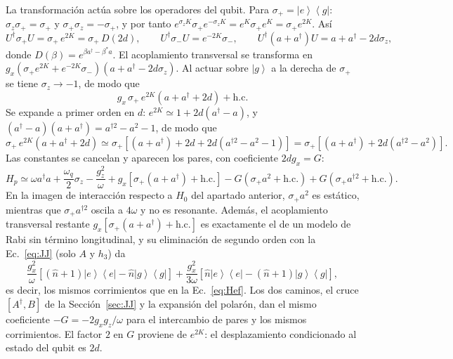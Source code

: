 \documentclass[11pt,a4paper]{article}
\newcommand{\ket}[1]{\left|#1\right\rangle}
\newcommand{\bra}[1]{\left\langle#1\right|}
\newcommand{\spl}{\sigma_{+}}
\newcommand{\smi}{\sigma_{-}}
\newcommand{\Pe}{\ket{e}\!\bra{e}}
\newcommand{\Pg}{\ket{g}\!\bra{g}}
\newcommand{\hn}{\hat n}
\theoremstyle{definition}
\begin{document}
La transformación actúa sobre los operadores del qubit. Para $\spl=\ket{e}\bra{g}$: $\sigma_z\spl=\spl$ y $\spl\sigma_z=-\spl$, y por tanto $e^{\sigma_zK}\spl e^{-\sigma_zK}=e^{K}\spl e^{K}=\spl e^{2K}$. Así
\begin{equation}
U^{\dagger}\spl U=\spl\,e^{2K}=\spl\,D(2d),\qquad U^{\dagger}\smi U=e^{-2K}\smi,\qquad U^{\dagger}(a+a^{\dagger})U=a+a^{\dagger}-2d\sigma_z,
\end{equation}
donde $D(\beta)=e^{\beta a^{\dagger}-\beta^{*}a}$. El acoplamiento transversal se transforma en $g_x(\spl e^{2K}+e^{-2K}\smi)(a+a^{\dagger}-2d\sigma_z)$. Al actuar sobre $\ket{g}$ a la derecha de $\spl$ se tiene $\sigma_z\to-1$, de modo que
\begin{equation}
g_x\,\spl\,e^{2K}\left(a+a^{\dagger}+2d\right)+\mathrm{h.c.}
\end{equation}
Se expande a primer orden en $d$: $e^{2K}\simeq1+2d(a^{\dagger}-a)$, y $(a^{\dagger}-a)(a+a^{\dagger})=a^{\dagger2}-a^2-1$, de modo que
\begin{equation}
\spl\,e^{2K}\left(a+a^{\dagger}+2d\right)\simeq\spl\left[(a+a^{\dagger})+2d+2d\left(a^{\dagger2}-a^2-1\right)\right]=\spl\left[(a+a^{\dagger})+2d\left(a^{\dagger2}-a^2\right)\right].
\end{equation}
Las constantes se cancelan y aparecen los pares, con coeficiente $2dg_x=G$:
\begin{equation}
H_p\simeq\omega a^{\dagger}a+\frac{\omega_q}{2}\sigma_z-\frac{g_z^2}{\omega}+g_x\left[\spl(a+a^{\dagger})+\mathrm{h.c.}\right]-G\left(\spl a^2+\mathrm{h.c.}\right)+G\left(\spl a^{\dagger2}+\mathrm{h.c.}\right).
\end{equation}
En la imagen de interacción respecto a $H_0$ del apartado anterior, $\spl a^2$ es estático, mientras que $\spl a^{\dagger2}$ oscila a $4\omega$ y no es resonante. Además, el acoplamiento transversal restante $g_x[\spl(a+a^{\dagger})+\mathrm{h.c.}]$ es exactamente el de un modelo de Rabi sin término longitudinal, y su eliminación de segundo orden con la Ec.~\eqref{eq:JJ} (solo $A$ y $h_3$) da
\begin{equation}
\frac{g_x^2}{\omega}\left[(\hn+1)\Pe-\hn\Pg\right]+\frac{g_x^2}{3\omega}\left[\hn\Pe-(\hn+1)\Pg\right],
\end{equation}
es decir, los mismos corrimientos que en la Ec.~\eqref{eq:Hef}. Los dos caminos, el cruce $[A^{\dagger},B]$ de la Sección~\ref{sec:JJ} y la expansión del polarón, dan el mismo coeficiente $-G=-2g_xg_z/\omega$ para el intercambio de pares y los mismos corrimientos. El factor $2$ en $G$ proviene de $e^{2K}$: el desplazamiento condicionado al estado del qubit es $2d$.
\end{document}
